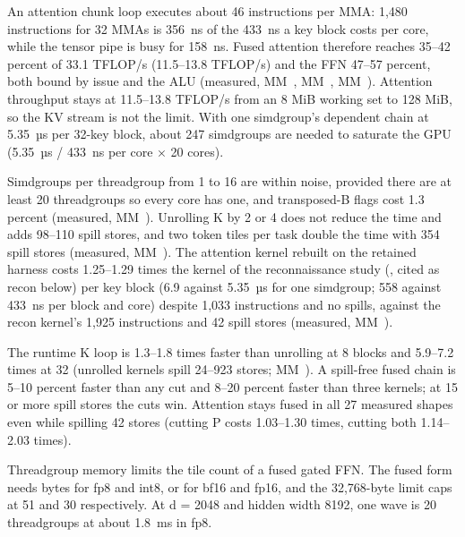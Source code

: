 An attention chunk loop executes about 46 instructions per MMA: 1,480 instructions for 32 MMAs is 356~ns of the 433~ns
a key block costs per core, while the tensor pipe is busy for 158~ns. Fused attention therefore reaches 35–42 percent
of 33.1 TFLOP/s (11.5–13.8 TFLOP/s) and the FFN 47–57 percent, both bound by issue and the ALU (measured, MM~,
MM~, MM~). Attention throughput stays at 11.5–13.8 TFLOP/s from an 8 MiB working set to 128 MiB, so
the KV stream is not the limit. With one simdgroup's dependent chain at 5.35~µs per 32-key block, about 247
simdgroups are needed to saturate the GPU (5.35~µs / 433~ns per core × 20 cores).

Simdgroups per threadgroup from 1 to 16 are within noise, provided there are at least 20 threadgroups so every core
has one, and transposed-B flags cost 1.3 percent (measured, MM~). Unrolling K by 2 or 4 does not reduce the
time and adds 98–110 spill stores, and two token tiles per task double the time with 354 spill stores (measured,
MM~). The attention kernel rebuilt on the retained harness costs 1.25–1.29 times the kernel of the
reconnaissance study (, cited as recon below) per key block (6.9
against 5.35~µs for one
simdgroup; 558 against 433~ns per block and core) despite 1,033 instructions and no spills, against the recon
kernel's 1,925 instructions and 42 spill stores (measured, MM~).

The runtime K loop is 1.3–1.8 times faster than unrolling at 8 blocks and 5.9–7.2 times at 32 (unrolled kernels
spill 24–923 stores; MM~). A spill-free fused chain is 5–10 percent faster than any cut and 8–20
percent faster than three kernels; at 15 or more spill stores the cuts win. Attention stays fused in all 27 measured
shapes even while spilling 42 stores (cutting P costs 1.03–1.30 times, cutting both 1.14–2.03 times).

Threadgroup memory limits the tile count of a fused gated FFN. The fused form needs  bytes for fp8
and int8, or  for bf16 and fp16, and the 32,768-byte limit caps  at 51 and 30
respectively. At d = 2048 and hidden width 8192, one wave is 20 threadgroups at about 1.8~ms in fp8.

